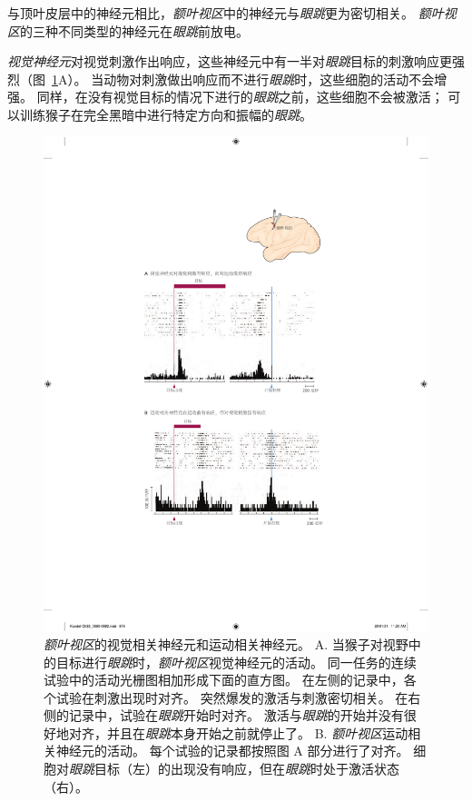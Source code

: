 与顶叶皮层中的神经元相比，\textit{额叶视区}中的神经元与\textit{眼跳}更为密切相关。
\textit{额叶视区}的三种不同类型的神经元在\textit{眼跳}前放电。


\textit{视觉神经元}对视觉刺激作出响应，这些神经元中有一半对\textit{眼跳}目标的刺激响应更强烈（图~\ref{fig:35_13}A）。
当动物对刺激做出响应而不进行\textit{眼跳}时，这些细胞的活动不会增强。
同样，在没有视觉目标的情况下进行的\textit{眼跳}之前，这些细胞不会被激活；
可以训练猴子在完全黑暗中进行特定方向和振幅的\textit{眼跳}。


\begin{figure}[htbp]
	\centering
	\includegraphics[width=0.8\linewidth]{chap35/fig_35_13}
	\caption{\textit{额叶视区}的视觉相关神经元和运动相关神经元\cite{bruce1985primate}。
		A. 当猴子对视野中的目标进行\textit{眼跳}时，\textit{额叶视区}视觉神经元的活动。
		同一任务的连续试验中的活动光栅图相加形成下面的直方图。
		在左侧的记录中，各个试验在刺激出现时对齐。
		突然爆发的激活与刺激密切相关。
		在右侧的记录中，试验在\textit{眼跳}开始时对齐。
		激活与\textit{眼跳}的开始并没有很好地对齐，并且在\textit{眼跳}本身开始之前就停止了。
		B. \textit{额叶视区}运动相关神经元的活动。
		每个试验的记录都按照图 A 部分进行了对齐。
		细胞对\textit{眼跳}目标（左）的出现没有响应，但在\textit{眼跳}时处于激活状态（右）。}
	\label{fig:35_13}
\end{figure}


